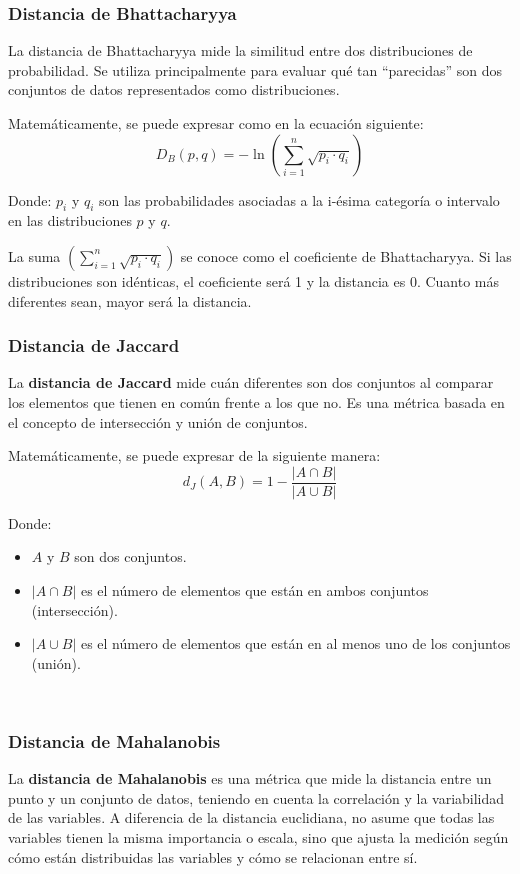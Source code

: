 \documentclass[12pt]{article}
\begin{document}
\subsubsection{Distancia de Bhattacharyya}
La distancia de Bhattacharyya mide la similitud entre dos distribuciones de probabilidad. Se utiliza principalmente
para evaluar qué tan “parecidas” son dos conjuntos de datos representados como distribuciones.

Matemáticamente, se puede expresar como en la ecuación siguiente:
\begin{equation}
    D_B(p, q) = -\ln \left( \sum_{i=1}^{n} \sqrt{p_i \cdot q_i} \right)
\end{equation}

Donde:
$p_i$ y $q_i$ son las probabilidades asociadas a la i-ésima categoría o intervalo en las distribuciones $p$ y $q$.

La suma $\left( \sum_{i=1}^{n} \sqrt{p_i \cdot q_i} \right)$ se conoce como el coeficiente de Bhattacharyya. Si las distribuciones son idénticas, el coeficiente será 1 y la distancia es 0. Cuanto más diferentes sean, mayor será la distancia.
~\cite{De0a100enIA}

\subsubsection{Distancia de Jaccard}
La \textbf{distancia de Jaccard} mide cuán diferentes son dos conjuntos al comparar los elementos que tienen en común frente a los que no. Es una métrica basada en el concepto de intersección y unión de conjuntos.

Matemáticamente, se puede expresar de la siguiente manera:
\begin{equation}
    d_J(A, B) = 1 - \frac{|A \cap B|}{|A \cup B|}
\end{equation}

Donde:
\begin{itemize}
    \item $A$ y $B$ son dos conjuntos.
    \item $|A \cap B|$ es el número de elementos que están en ambos conjuntos (intersección).
    \item $|A \cup B|$ es el número de elementos que están en al menos uno de los conjuntos (unión).
\end{itemize}
~\cite{De0a100enIA}

\subsubsection{Distancia de Mahalanobis}
La \textbf{distancia de Mahalanobis} es una métrica que mide la distancia entre un punto y un conjunto de datos, teniendo en cuenta la correlación y la variabilidad de las variables. A diferencia de la distancia euclidiana, no asume que todas las variables tienen la misma importancia o escala,
sino que ajusta la medición según cómo están distribuidas las variables y cómo se relacionan entre sí.
\end{document}
